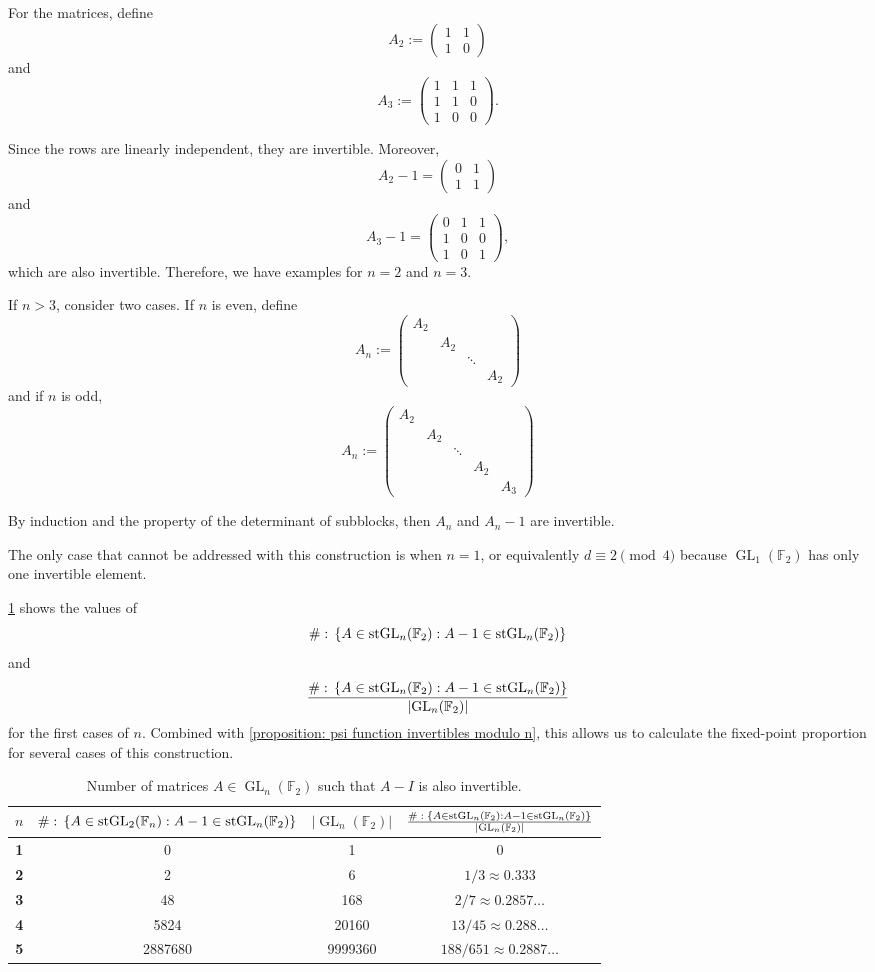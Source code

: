 \documentclass{amsart}
\def\set#1{{\def\st{\;:\;}\left\{#1\right\}}}
\def\abs#1{\left\vert{#1}\right\vert}
\def\mat#1{\left(\begin{matrix}#1\end{matrix}\right)}
\def\FF{\mathbb F}
\DeclareMathOperator{\st}{st}
\DeclareMathOperator{\GL}{GL}
\begin{document}
For the matrices, define $$A_2 := \mat{1 & 1 \\ 1 & 0}$$ and $$A_3 := \mat{1 & 1 & 1 \\ 1 & 1 & 0 \\ 1 & 0 & 0}.$$

Since the rows are linearly independent, they are invertible. Moreover, $$A_2 - 1 = \mat{0 & 1 \\ 1 & 1}$$ and $$A_3 - 1 = \mat{0 & 1 & 1 \\ 1 & 0 & 0 \\ 1 & 0 & 1},$$ which are also invertible. Therefore, we have examples for $n = 2$ and $n = 3$. 

If $n > 3$, consider two cases. If $n$ is even, define $$A_n := \mat{A_2 & & & \\ & A_2 & & \\ & & \ddots & \\ & & & A_2 }$$ and if $n$ is odd, $$A_n := \mat{A_2 & & & & \\ & A_2 & & & \\ & & \ddots & & \\ & & & A_2 & \\ & & & & A_3}$$

By induction and the property of the determinant of subblocks, then $A_n$ and $A_n-1$ are invertible. 

The only case that cannot be addressed with this construction is when $n = 1$, or equivalently $d \equiv 2 \pmod 4$ because $\GL_1(\FF_2)$ has only one invertible element.

\cref{table: matrices invertible} shows the values of $$\# \set{A \in \GL_n(\FF_2): A-1 \in \GL_n(\FF_2)}$$ and $$\frac{\# \set{A \in \GL_n(\FF_2): A-1 \in \GL_n(\FF_2)}}{\abs{\GL_n(\FF_2)}}$$ for the first cases of $n$. Combined with \cref{proposition: psi function invertibles modulo n}, this allows us to calculate the fixed-point proportion for several cases of this construction.

\begin{table}[h!]
\begin{tabular}{|c|c|c|c|}
\hline
\textbf{$n$} & \textbf{$\# \set{A \in \GL_2(\FF_n): A-1 \in \GL_n(\FF_2)}$} & \textbf{$\abs{\GL_n(\FF_2)}$} & \textbf{$\frac{\# \set{A \in \GL_n(\FF_2): A-1 \in \GL_n(\FF_2)}}{\abs{\GL_n(\FF_2)}}$} \\ \hline
\textbf{1} & 0 & 1 & 0  \\ \hline
\textbf{2} & 2 & 6 & $1/3 \approx 0.333$ \\ \hline
\textbf{3} & 48 & 168 & $2/7 \approx 0.2857 \dots$  \\ \hline
\textbf{4} & 5824 & 20160 & $13/45 \approx 0.288 \dots$  \\ \hline
\textbf{5} & 2887680 & 9999360 & $188/651 \approx 0.2887 \dots$ \\ \hline
\end{tabular}
\caption{Number of matrices $A \in \GL_n(\FF_2)$ such that $A-I$ is also invertible.}
\label{table: matrices invertible}
\end{table}
\end{document}
